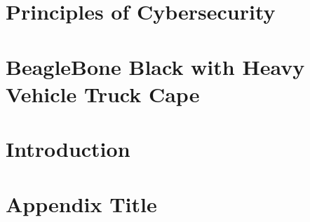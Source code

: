 \chapter{Principles of Cybersecurity}


\chapter{BeagleBone Black with Heavy Vehicle Truck Cape}


\chapter{Introduction}


\appendix
\chapter{Appendix Title}


